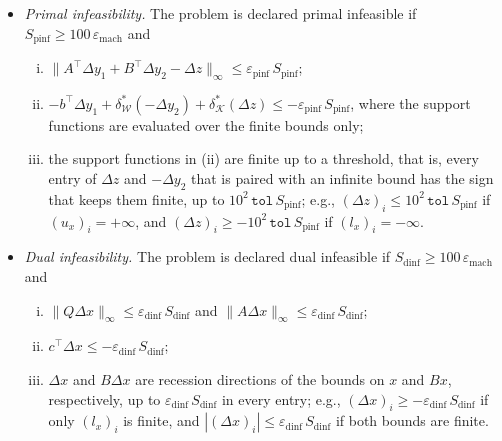 \begin{itemize}
    \item \emph{Primal infeasibility.} The problem is declared primal infeasible if $S_{\mathrm{pinf}} \ge 100\,\varepsilon_{\mathrm{mach}}$ and
    \begin{enumerate}[(i)]
        \item $\|A^\top \Delta y_1 + B^\top \Delta y_2 - \Delta z\|_\infty \le \varepsilon_{\mathrm{pinf}}\, S_{\mathrm{pinf}}$;
        \item $-b^\top \Delta y_1 + \delta^\ast_{\mathcal{W}}(-\Delta y_2) + \delta^\ast_{\mathcal{K}}(\Delta z) \le -\varepsilon_{\mathrm{pinf}}\, S_{\mathrm{pinf}}$, where the support functions are evaluated over the finite bounds only;
        \item the support functions in (ii) are finite up to a threshold, that is, every entry of $\Delta z$ and $-\Delta y_2$ that is paired with an infinite bound has the sign that keeps them finite, up to $10^2\,\texttt{tol}\,S_{\mathrm{pinf}}$; e.g., $(\Delta z)_i \le 10^2\,\texttt{tol}\,S_{\mathrm{pinf}}$ if $(u_x)_i = +\infty$, and $(\Delta z)_i \ge -10^2\,\texttt{tol}\,S_{\mathrm{pinf}}$ if $(l_x)_i = -\infty$.
    \end{enumerate}
    \item \emph{Dual infeasibility.} The problem is declared dual infeasible if $S_{\mathrm{dinf}} \ge 100\,\varepsilon_{\mathrm{mach}}$ and
    \begin{enumerate}[(i)]
        \item $\|Q\Delta x\|_\infty \le \varepsilon_{\mathrm{dinf}}\, S_{\mathrm{dinf}}$ and $\|A\Delta x\|_\infty \le \varepsilon_{\mathrm{dinf}}\, S_{\mathrm{dinf}}$;
        \item $c^\top \Delta x \le -\varepsilon_{\mathrm{dinf}}\, S_{\mathrm{dinf}}$;
        \item $\Delta x$ and $B\Delta x$ are recession directions of the bounds on $x$ and $Bx$, respectively, up to $\varepsilon_{\mathrm{dinf}}\, S_{\mathrm{dinf}}$ in every entry; e.g., $(\Delta x)_i \ge -\varepsilon_{\mathrm{dinf}}\, S_{\mathrm{dinf}}$ if only $(l_x)_i$ is finite, and $|(\Delta x)_i| \le \varepsilon_{\mathrm{dinf}}\, S_{\mathrm{dinf}}$ if both bounds are finite.
    \end{enumerate}
\end{itemize}
